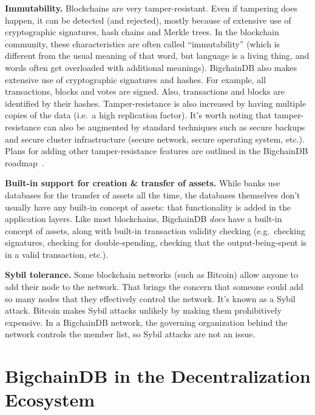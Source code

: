 \documentclass[a4paper]{article}
\begin{document}
\noindent \textbf{Immutability.}
Blockchains are very tamper-resistant.
Even if tampering does happen, it can be detected
(and rejected),
mostly because of extensive use of cryptographic signatures,
hash chains and Merkle trees.
In the blockchain community,
these characteristics are often called ``immutability''
(which is different from the usual meaning of that word,
but language is a living thing,
and words often get overloaded with additional meanings).
BigchainDB also makes extensive use
of cryptographic signatures and hashes.
For example, all transactions,
blocks and votes are signed.
Also, transactions and blocks are identified
by their hashes.
Tamper-resistance is also increased
by having multiple copies of the data
(i.e.~a high replication factor).
It's worth noting that tamper-resistance can also be augmented
by standard techniques such as secure backups
and secure cluster infrastructure (secure network, secure operating system, etc.).
Plans for adding other tamper-resistance features
are outlined in the BigchainDB roadmap~\cite{bigchaindb_roadmap}.

\vspace{1 em}

\noindent \textbf{Built-in support for creation \& transfer of assets.}
While banks use databases for the transfer of assets all the time,
the databases themselves don't usually have any built-in concept of assets:
that functionality is added in the application layers.
Like most blockchains,
BigchainDB \emph{does} have a built-in concept of assets,
along with built-in
transaction validity checking
(e.g.~checking signatures,
checking for double-spending,
checking that the output-being-spent is in a valid transaction, etc.).

\vspace{1 em}

\noindent \textbf{Sybil tolerance.}
Some blockchain networks (such as Bitcoin) allow anyone
to add their node to the network.
That brings the concern that someone could add
so many nodes that they effectively control the network.
It's known as a Sybil attack.
Bitcoin makes Sybil attacks unlikely by making them
prohibitively expensive.
In a BigchainDB network,
the governing organization behind the network
controls the member list,
so Sybil attacks are not an issue.


\section{BigchainDB in the Decentralization \mbox{Ecosystem}}
\end{document}
